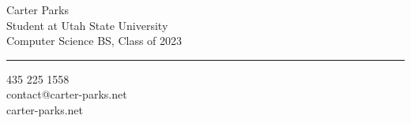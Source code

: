 \documentclass[12pt]{article}
\begin{document}
\sffamily

\begin{multicols}{2}
{ \Huge Carter Parks}\\

{\color{mainGray}
Student at Utah State University\\
Computer Science BS, Class of 2023
}
\vspace{14pt}
{\color{hrulegray}\hrule
}

\columnbreak

\begin{flushright}
{\small {}
435\,\textbullet\,225\,\textbullet\,1558\\
contact@carter-parks.net\\
carter-parks.net\\
}
\end{flushright}

\end{multicols}
\end{document}
